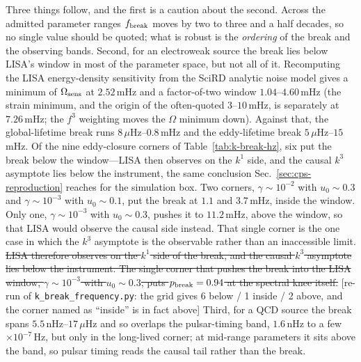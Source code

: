 \documentclass[10pt,prd,aps,nobibnotes,superscriptaddress,preprintnumbers,notitlepage]{revtex4-1}
\newcommand{\add}[1]{{\color{red}#1}}
\newcommand{\del}[1]{{\color{red}\sout{#1}}}
\newcommand{\why}[1]{{\color{red}\footnotesize\textsf{[#1]}}}
\newcommand{\add}[1]{#1}
\newcommand{\del}[1]{}
\newcommand{\why}[1]{}
\begin{document}
{Three things follow, and the first is a caution about the second. Across the admitted
parameter ranges $f_{\rm break}$ moves by two to three and a half decades, so no single
value should be quoted; what is robust is the \emph{ordering} of the break and the
observing bands. Second, for an electroweak source the break lies below LISA's window in
\add{most of the parameter space, but not all of it}. Recomputing the LISA
energy-density sensitivity from the SciRD analytic noise model
\add{\cite{Robson:2018ifk}} gives a minimum of $\Omega_{\rm sens}$ at
$2.52\,$mHz and a factor-of-two window $1.04$--$4.60\,$mHz (the strain minimum, and the
origin of the often-quoted $3$--$10\,$mHz, is separately at $7.26\,$mHz; the $f^{3}$
weighting moves the $\Omega$ minimum down). Against that, the global-lifetime break runs
$8\,\mu$Hz--$0.8\,$mHz and the eddy-lifetime break $5\,\mu$Hz--$15\,$mHz.
\add{Of the nine eddy-closure corners of Table~\ref{tab:k-break-hz}, six put the break
below the window---LISA then observes on the $k^{1}$ side, and the causal $k^{3}$
asymptote lies below the instrument, the same conclusion
Sec.~\ref{sec:cps-reproduction} reaches for the simulation box. Two corners,
$\gamma\sim10^{-2}$ with $u_0\sim0.3$ and $\gamma\sim10^{-3}$ with $u_0\sim0.1$, put the
break at $1.1$ and $3.7\,$mHz, inside the window. Only one,
$\gamma\sim10^{-3}$ with $u_0\sim0.3$, pushes it to $11.2\,$mHz, above the window, so
that LISA would observe the causal side instead. That single corner is the one case in
which the $k^{3}$ asymptote is the observable rather than an inaccessible limit.}
\del{LISA therefore observes on the $k^{1}$ side of the break, and the causal $k^{3}$
asymptote lies below the instrument. The single corner that pushes the break into the
LISA window, $\gamma\sim10^{-3}$ with $u_0\sim0.3$, puts $p_{\rm break}=0.94$ at the
spectral knee itself.}
\why{re-run of \texttt{k\_break\_frequency.py}: the grid gives 6 below / 1 inside / 2
above, and the corner named as ``inside'' is in fact above} Third, for a QCD source the break spans $5.5\,$nHz--$17\,\mu$Hz and so overlaps
the pulsar-timing band, $1.6\,$nHz to a few $\times10^{-7}\,$Hz, but only in the
long-lived corner; at mid-range parameters it sits above the band, so pulsar timing reads
the causal tail rather than the break.

}
\end{document}
